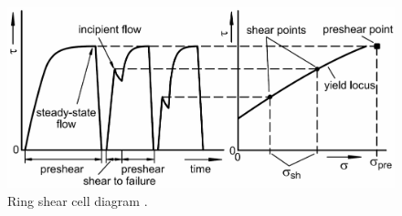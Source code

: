 \begin{figure}[!htb]
\centering
\includegraphics[width=.80\columnwidth]{images/002srsctdiagram}
\caption[Ring shear cell diagram]{Ring shear cell diagram \cite{RefWorks:69}.}
\label{fig:002srsctdiagram}
\end{figure}